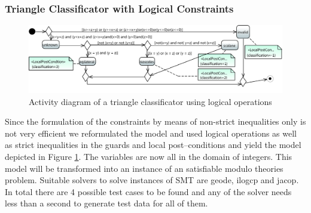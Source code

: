 \subsubsection{Triangle Classificator with Logical Constraints}
\begin{figure}
\includegraphics[width=\textwidth]{./pics/TriangleSMT.pdf}
\caption{Activity diagram of a triangle classificator using logical operations}
\label{fig:TriangleSMT}
\end{figure}
Since the formulation of the constraints by means of non-strict inequalities only is not very efficient we reformulated the model and used logical operations as well as strict inequalities in the guards and local post--conditions and yield the model depicted in Figure \ref{fig:TriangleSMT}. The variables are now all in the domain of integers. This model will be transformed into an instance of an satisfiable modulo theories problem. Suitable solvers to solve instances of SMT are geode, ilogcp and jacop. In total there are 4 possible test cases to be found and any of the solver needs less than a second to generate test data for all of them.
